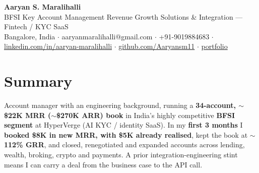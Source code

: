 \documentclass[10pt,a4paper]{article}
\begin{document}
\vspace*{-1cm}
\begin{center}
{\LARGE\bfseries Aaryan S. Maralihalli}\\[0.5em]
{\large BFSI Key Account Management  \textbar{}  Revenue Growth  \textbar{}  Solutions \& Integration --- Fintech / KYC SaaS}\\[0.3em]
Bangalore, India $\cdot$ aaryanmaralihalli@gmail.com $\cdot$ +91-9019884683 $\cdot$ \href{https://linkedin.com/in/aaryan-maralihalli}{linkedin.com/in/aaryan-maralihalli} $\cdot$ \href{https://github.com/Aaryansm11}{github.com/Aaryansm11} $\cdot$ \href{https://portfolio-zeta-ten-85.vercel.app}{portfolio}
\end{center}\vspace{0.4ex}
\section*{Summary}
Account manager with an engineering background, running a \textbf{34-account, $\sim$\$22K MRR ($\sim$\$270K ARR) book} in India's highly competitive \textbf{BFSI segment} at HyperVerge (AI KYC / identity SaaS). In my \textbf{first 3 months} I \textbf{booked \$8K in new MRR, with \$5K already realised}, kept the book at \textbf{$\sim$112\% GRR}, and closed, renegotiated and expanded accounts across lending, wealth, broking, crypto and payments. A prior integration-engineering stint means I can carry a deal from the business case to the API call.\par\vspace{2pt}
\end{document}
